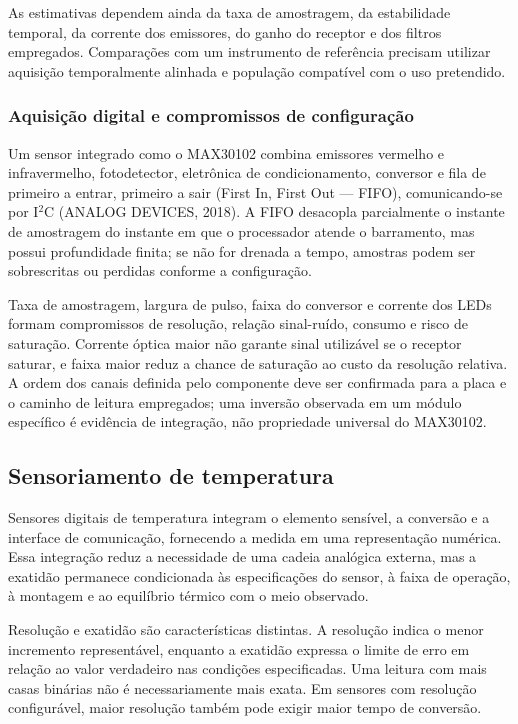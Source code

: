 \documentclass[a4paper,12pt]{article}
\begin{document}
As estimativas dependem ainda da taxa de amostragem, da estabilidade temporal, da corrente dos emissores, do ganho do receptor e dos filtros empregados. Compara\c{c}\~oes com um instrumento de refer\^encia precisam utilizar aquisi\c{c}\~ao temporalmente alinhada e popula\c{c}\~ao compat\'ivel com o uso pretendido.


\subsubsection{Aquisi\c{c}\~ao digital e compromissos de configura\c{c}\~ao}


Um sensor integrado como o MAX30102 combina emissores vermelho e infravermelho, fotodetector, eletr\^onica de condicionamento, conversor e fila de primeiro a entrar, primeiro a sair (First In, First Out --- FIFO), comunicando-se por I$^2$C (ANALOG DEVICES, 2018). A FIFO desacopla parcialmente o instante de amostragem do instante em que o processador atende o barramento, mas possui profundidade finita; se n\~ao for drenada a tempo, amostras podem ser sobrescritas ou perdidas conforme a configura\c{c}\~ao.


Taxa de amostragem, largura de pulso, faixa do conversor e corrente dos LEDs formam compromissos de resolu\c{c}\~ao, rela\c{c}\~ao sinal-ru\'ido, consumo e risco de satura\c{c}\~ao. Corrente \'optica maior n\~ao garante sinal utiliz\'avel se o receptor saturar, e faixa maior reduz a chance de satura\c{c}\~ao ao custo da resolu\c{c}\~ao relativa. A ordem dos canais definida pelo componente deve ser confirmada para a placa e o caminho de leitura empregados; uma invers\~ao observada em um m\'odulo espec\'ifico \'e evid\^encia de integra\c{c}\~ao, n\~ao propriedade universal do MAX30102.


\subsection{Sensoriamento de temperatura}


Sensores digitais de temperatura integram o elemento sens\'ivel, a convers\~ao e a interface de comunica\c{c}\~ao, fornecendo a medida em uma representa\c{c}\~ao num\'erica. Essa integra\c{c}\~ao reduz a necessidade de uma cadeia anal\'ogica externa, mas a exatid\~ao permanece condicionada \`as especifica\c{c}\~oes do sensor, \`a faixa de opera\c{c}\~ao, \`a montagem e ao equil\'ibrio t\'ermico com o meio observado.


Resolu\c{c}\~ao e exatid\~ao s\~ao caracter\'isticas distintas. A resolu\c{c}\~ao indica o menor incremento represent\'avel, enquanto a exatid\~ao expressa o limite de erro em rela\c{c}\~ao ao valor verdadeiro nas condi\c{c}\~oes especificadas. Uma leitura com mais casas bin\'arias n\~ao \'e necessariamente mais exata. Em sensores com resolu\c{c}\~ao configur\'avel, maior resolu\c{c}\~ao tamb\'em pode exigir maior tempo de convers\~ao.
\end{document}
